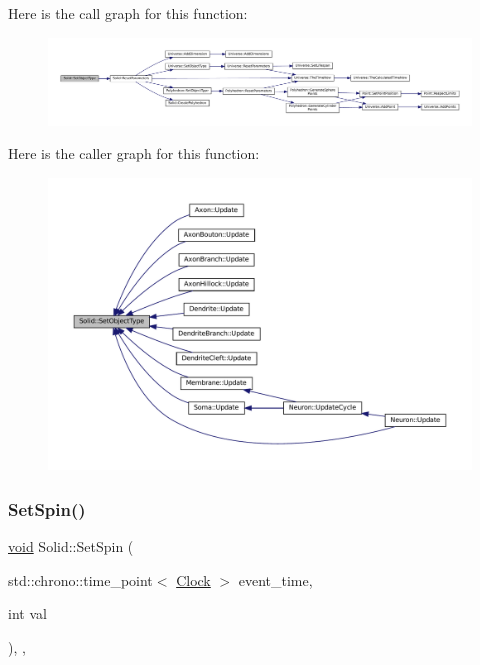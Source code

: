 Here is the call graph for this function\+:\nopagebreak
\begin{figure}[H]
\begin{center}
\leavevmode
\includegraphics[width=350pt]{class_solid_af6fe46af0be9a9533e114b1c0f186bfc_cgraph}
\end{center}
\end{figure}
Here is the caller graph for this function\+:\nopagebreak
\begin{figure}[H]
\begin{center}
\leavevmode
\includegraphics[width=350pt]{class_solid_af6fe46af0be9a9533e114b1c0f186bfc_icgraph}
\end{center}
\end{figure}
\mbox{\label{class_solid_a615cb8d1ec1376781726bcefa86339cb}} 
\subsubsection{\texorpdfstring{Set\+Spin()}{SetSpin()}}
{\footnotesize\ttfamily \mbox{\hyperlink{glad_8h_a950fc91edb4504f62f1c577bf4727c29}{void}} Solid\+::\+Set\+Spin (\begin{DoxyParamCaption}\item[{std\+::chrono\+::time\+\_\+point$<$ \mbox{\hyperlink{universe_8h_a0ef8d951d1ca5ab3cfaf7ab4c7a6fd80}{Clock}} $>$}]{event\+\_\+time,  }\item[{int}]{val }\end{DoxyParamCaption})\hspace{0.3cm}{\ttfamily [inline]}, {\ttfamily [final]}, {\ttfamily [virtual]}}



